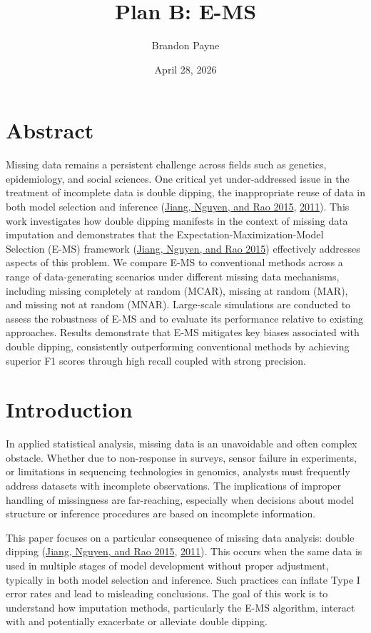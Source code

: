 \documentclass[
  12pt,
]{article}
\title{Plan B: E-MS}
\subtitle{A THESIS SUBMITTED IN PARTIAL FULFILLMENT OF THE REQUIREMENTS
FOR THE DEGREE OF MASTER OF PUBLIC HEALTH DATA SCIENCE

Committee:

Dr.~J. Sunil Rao (Plan B Advisor) 

Dr.~Lynn Eberly (Academic
Advisor) 

Dr.~Weihong Tang}
\author{Brandon Payne}
\date{April 28, 2026}
\begin{document}
\maketitle

\newpage

\hypertarget{abstract}{%
\section*{Abstract}\label{abstract}}

Missing data remains a persistent challenge across fields such as
genetics, epidemiology, and social sciences. One critical yet
under-addressed issue in the treatment of incomplete data is double
dipping, the inappropriate reuse of data in both model selection and
inference (\protect\hyperlink{ref-Sunilems}{Jiang, Nguyen, and Rao
2015}, \protect\hyperlink{ref-jiang2011best}{2011}). This work
investigates how double dipping manifests in the context of missing data
imputation and demonstrates that the Expectation-Maximization-Model
Selection (E-MS) framework (\protect\hyperlink{ref-Sunilems}{Jiang,
Nguyen, and Rao 2015}) effectively addresses aspects of this problem.
We compare E-MS to conventional methods across a range of
data-generating scenarios under different missing data mechanisms,
including missing completely at random (MCAR), missing at random (MAR),
and missing not at random (MNAR). Large-scale simulations are conducted
to assess the robustness of E-MS and to evaluate its performance
relative to existing approaches. Results demonstrate that E-MS mitigates
key biases associated with double dipping, consistently outperforming
conventional methods by achieving superior F1 scores through high recall
coupled with strong precision.

\section{Introduction}

In applied statistical analysis, missing data is an unavoidable and
often complex obstacle. Whether due to non-response in surveys, sensor
failure in experiments, or limitations in sequencing technologies in
genomics, analysts must frequently address datasets with incomplete
observations. The implications of improper handling of missingness are
far-reaching, especially when decisions about model structure or
inference procedures are based on incomplete information.

This paper focuses on a particular consequence of missing data analysis:
double dipping (\protect\hyperlink{ref-Sunilems}{Jiang, Nguyen, and Rao
2015}, \protect\hyperlink{ref-jiang2011best}{2011}). This occurs when
the same data is used in multiple stages of model development without
proper adjustment, typically in both model selection and inference. Such
practices can inflate Type I error rates and lead to misleading
conclusions. The goal of this work is to understand how imputation
methods, particularly the E-MS algorithm, interact with and potentially
exacerbate or alleviate double dipping.
\end{document}
